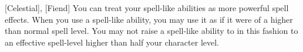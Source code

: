  {[Celestial], [Fiend]}
\shortfeat
{You can treat your spell-like abilities as more powerful spell effects.}
{When you use a spell-like ability, you may use it as if it were of a higher than normal spell level. You may not raise a spell-like ability to in this fashion to an effective spell-level higher than half your character level.}